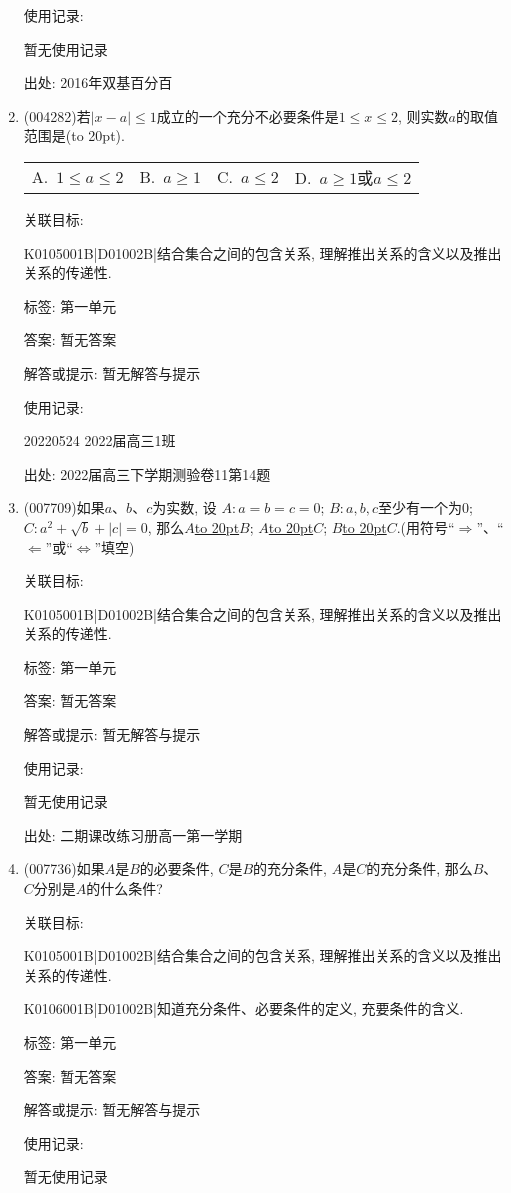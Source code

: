 \documentclass[10pt,a4paper]{article}
\newcommand{\blank}[1]{\underline{\hbox to #1pt{}}}
\newcommand{\bracket}[1]{(\hbox to #1pt{})}
\newcommand{\fourch}[4]{\par\begin{tabular}{p{.23\textwidth}p{.23\textwidth}p{.23\textwidth}p{.23\textwidth}}
A.~#1 &B.~#2& C.~#3& D.~#4
\end{tabular}}
\begin{document}
\begin{enumerate}[1.]
使用记录:

暂无使用记录


出处: 2016年双基百分百
\item { (004282)}若$|x-a|\le 1$成立的一个充分不必要条件是$1\le x\le 2$, 则实数$a$的取值范围是\bracket{20}.
\fourch{$1\le a\le 2$}{$a\ge 1$}{$a\le 2$}{$a\ge 1$或$a\le 2$}


关联目标:

K0105001B|D01002B|结合集合之间的包含关系, 理解推出关系的含义以及推出关系的传递性.



标签: 第一单元

答案: 暂无答案

解答或提示: 暂无解答与提示

使用记录:

20220524	2022届高三1班	


出处: 2022届高三下学期测验卷11第14题
\item { (007709)}如果$a$、$b$、$c$为实数, 设
$A:a=b=c=0$; $B:a,b,c$至少有一个为$0$; $C:a^2+\sqrt b+|c|=0$, 那么$A$\blank{20}$B$; $A$\blank{20}$C$; $B$\blank{20}$C$.(用符号``$\Rightarrow$''、``$\Leftarrow$''或``$\Leftrightarrow$''填空)


关联目标:

K0105001B|D01002B|结合集合之间的包含关系, 理解推出关系的含义以及推出关系的传递性.



标签: 第一单元

答案: 暂无答案

解答或提示: 暂无解答与提示

使用记录:

暂无使用记录


出处: 二期课改练习册高一第一学期
\item { (007736)}如果$A$是$B$的必要条件, $C$是$B$的充分条件, $A$是$C$的充分条件, 那么$B$、$C$分别是$A$的什么条件?


关联目标:

K0105001B|D01002B|结合集合之间的包含关系, 理解推出关系的含义以及推出关系的传递性.

K0106001B|D01002B|知道充分条件、必要条件的定义, 充要条件的含义.



标签: 第一单元

答案: 暂无答案

解答或提示: 暂无解答与提示

使用记录:

暂无使用记录



\end{enumerate}
\end{document}
